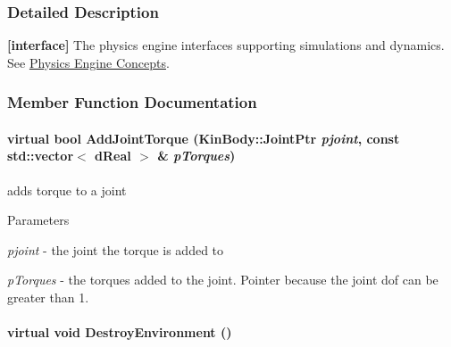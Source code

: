 \subsubsection{Detailed Description}
{\bfseries \mbox{[}interface\mbox{]}} The physics engine interfaces supporting simulations and dynamics. See \hyperlink{arch__physicsengine}{Physics Engine Concepts}. 

\subsubsection{Member Function Documentation}
\hypertarget{classOpenRAVE_1_1PhysicsEngineBase_ac967d28c3b1f7df4280dc32b25bc9227}{
\paragraph[{AddJointTorque}]{\setlength{\rightskip}{0pt plus 5cm}virtual bool AddJointTorque (KinBody::JointPtr {\em pjoint}, \/  const std::vector$<$ dReal $>$ \& {\em pTorques})}\hfill}
\label{classOpenRAVE_1_1PhysicsEngineBase_ac967d28c3b1f7df4280dc32b25bc9227}
adds torque to a joint 
\begin{DoxyParams}{Parameters}
\item[{\em pjoint}]-\/ the joint the torque is added to \item[{\em pTorques}]-\/ the torques added to the joint. Pointer because the joint dof can be greater than 1. \end{DoxyParams}
\hypertarget{classOpenRAVE_1_1PhysicsEngineBase_addd261b357621ad88f262f311792efb6}{
\paragraph[{DestroyEnvironment}]{\setlength{\rightskip}{0pt plus 5cm}virtual void DestroyEnvironment ()}\hfill}
\label{classOpenRAVE_1_1PhysicsEngineBase_addd261b357621ad88f262f311792efb6}
